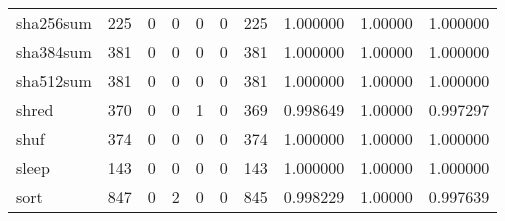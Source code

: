 \begin{longtable}{lrrrrrrrrr}
sha256sum &                    225 &                                  0 &                                 0 &                                0 &                                 0 &                             225 &                                1.000000 &                                1.00000 &                             1.000000 \\
sha384sum &                    381 &                                  0 &                                 0 &                                0 &                                 0 &                             381 &                                1.000000 &                                1.00000 &                             1.000000 \\
sha512sum &                    381 &                                  0 &                                 0 &                                0 &                                 0 &                             381 &                                1.000000 &                                1.00000 &                             1.000000 \\
shred     &                    370 &                                  0 &                                 0 &                                1 &                                 0 &                             369 &                                0.998649 &                                1.00000 &                             0.997297 \\
shuf      &                    374 &                                  0 &                                 0 &                                0 &                                 0 &                             374 &                                1.000000 &                                1.00000 &                             1.000000 \\
sleep     &                    143 &                                  0 &                                 0 &                                0 &                                 0 &                             143 &                                1.000000 &                                1.00000 &                             1.000000 \\
sort      &                    847 &                                  0 &                                 2 &                                0 &                                 0 &                             845 &                                0.998229 &                                1.00000 &                             0.997639 \\

\end{longtable}
